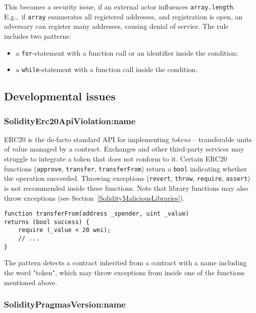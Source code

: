 This becomes a security issue, if an external actor influences \texttt{array.length}.
E.g.,~if \texttt{array} enumerates all registered addresses, and registration is open, an adversary can register many addresses, causing denial of service.
The rule includes two patterns:
\begin{itemize}
	\item a \texttt{for}-statement with a function call or an identifier inside the condition;
	\item a \texttt{while}-statement with a function call inside the condition.
\end{itemize}

\subsection{Developmental issues} \label{sec:DevelopmentalIssues}

\subsubsection{\usevalue SolidityErc20ApiViolation:name } \label{SolidityErc20ApiViolation}

ERC20 is the de-facto standard API for implementing \textit{tokens} -- transferable units of value managed by a contract.
Exchanges and other third-party services may struggle to integrate a token that does not conform to it.
Certain ERC20 functions (\texttt{approve}, \texttt{transfer}, \texttt{transferFrom}) return a \texttt{bool} indicating whether the operation succeeded.
Throwing exceptions (\texttt{revert}, \texttt{throw}, \texttt{require}, \texttt{assert}) is not recommended inside these functions.
Note that library functions may also throw exceptions (see Section~\ref{SolidityMaliciousLibraries}).

\begin{lstlisting}[language=Solidity]
function transferFrom(address _spender, uint _value)
returns (bool success) {
	require (_value < 20 wei);
	// ...
}
\end{lstlisting}

The pattern detects a contract inherited from a contract with a name including the word "token", which may throw exceptions from inside one of the functions mentioned above.

\subsubsection{\usevalue SolidityPragmasVersion:name } \label{SolidityPragmasVersion}


